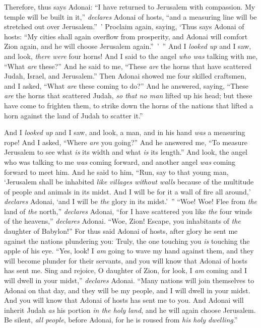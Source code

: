 \begin{biblechapter}
\verse Therefore, thus says Adonai: “I have returned to Jerusalem with compassion. My temple will be built in it,” \textit{declares} Adonai of hosts, “and a measuring line will be stretched out over Jerusalem.” ’
\verse Proclaim again, saying, ‘Thus says Adonai of hosts: “My cities shall again overflow from prosperity, and Adonai will comfort Zion again, and he will choose Jerusalem again.” ’ ”
  And I \textit{looked up} and I saw, and look, \textit{there were} four horns!
\verse And I said to the angel \textit{who was} talking with me, “What \textit{are} these?” And he said to me, “These \textit{are} the horns that have scattered Judah, Israel, and Jerusalem.”
\verse Then Adonai showed me four skilled craftsmen,
\verse and I asked, “What \textit{are} these coming to do?” And he answered, saying, “These \textit{are} the horns that scattered Judah, \textit{so that no man} lifted up his head; but these have come to frighten them, to strike down the horns of the nations that lifted a horn against the land of Judah to scatter it.”
\end{biblechapter}

\begin{biblechapter} %
 And I \textit{looked up} and I saw, and look, a man, and in his hand \textit{was} a measuring rope!
\verse And I asked, “Where \textit{are} you going?” And he answered me, “To measure Jerusalem to see what \textit{is} its width and what \textit{is} its length.”
\verse And look, the angel who was talking to me \textit{was} coming forward, and another angel \textit{was} coming forward to meet him.
\verse And he said to him, “Run, say to that young man, ‘Jerusalem shall be inhabited \textit{like villages without walls} because of the multitude of people and animals in its midst.
\verse And I will be for it a wall of fire all around,’ \textit{declares} Adonai, ‘and I will be \textit{the} glory in its midst.’ ”
\verse “Woe! Woe! Flee from \textit{the} land of \textit{the} north,” \textit{declares} Adonai, “for I have scattered you like \textit{the} four winds of the heavens,” \textit{declares} Adonai.
\verse “Woe, Zion! Escape, you inhabitants of \textit{the} daughter of Babylon!”
\verse For thus said Adonai of hosts, after glory he sent me against the nations plundering you: Truly, the one touching you \textit{is} touching the apple of his eye.
\verse “Yes, look! I \textit{am} going to wave my hand against them, and they will become plunder for their servants, and you will know that Adonai of hosts has sent me.
\verse Sing and rejoice, O daughter of Zion, for look, I \textit{am} coming and I will dwell in your midst,” \textit{declares} Adonai.
\verse “Many nations will join themselves to Adonai on that day, and they will be my people, and I will dwell in your midst. And you will know that Adonai of hosts has sent me to you.
\verse And Adonai will inherit Judah \textit{as} his portion \textit{in the holy land}, and he will again choose Jerusalem.
\verse Be silent, \textit{all people}, before Adonai, for he is roused from \textit{his holy dwelling}.”
\end{biblechapter}

